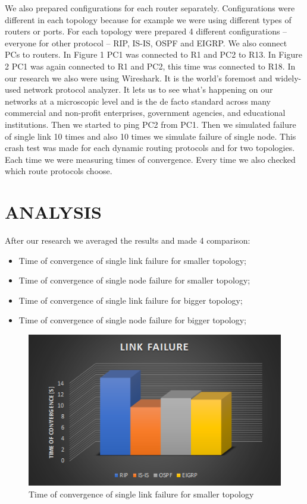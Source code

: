 \documentclass[conference,compsoc]{IEEEtran}
\begin{document}
We also prepared configurations for each router separately. Configurations were different in each topology because for example we were using different types of routers or ports. For each topology were prepared 4 different configurations – everyone for other protocol – RIP, IS-IS, OSPF and EIGRP.
We also connect PCs to routers. In Figure 1 PC1 was connected to R1 and PC2 to R13. In Figure 2 PC1 was again connected to R1 and PC2, this time was connected to R18.
In our research we also were using Wireshark. It is the world’s foremost and widely-used network protocol analyzer. It lets us to see what’s happening on our networks at a microscopic level and is the de facto standard across many commercial and non-profit enterprises, government agencies, and educational institutions.
Then we started to ping PC2 from PC1. Then we simulated failure of single link 10 times and also 10 times we simulate failure of single node. This crash test was made for each dynamic routing protocols and for two topologies. Each time we were measuring times of convergence. Every time we also checked which route protocols choose.

\section{ANALYSIS}

After our research we averaged the results and made 4 comparison:
\begin{itemize}
\item Time of convergence of single link failure for smaller topology;
\item Time of convergence of single node failure for smaller topology;
\item Time of convergence of single link failure for bigger topology;
\item Time of convergence of single node failure for bigger topology;

\end{itemize}

\begin{figure}[!h]
  \centering
  \includegraphics[width=\columnwidth]{images/f3}
  \caption{Time of convergence of single link failure for smaller topology}
\end{figure}
\end{document}

